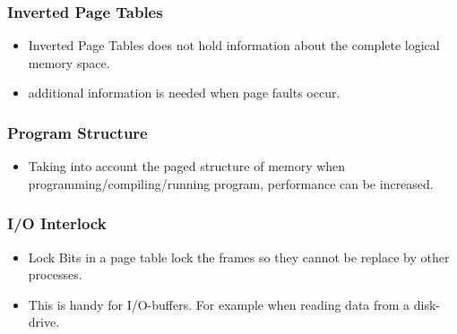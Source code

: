 \documentclass[a4wide,10pt]{article}
\begin{document}
	\subsubsection{Inverted Page Tables} %
	\label{ssub:inverted_page_tables}
	\begin{itemize}
		\item Inverted Page Tables does not hold information about the complete logical memory space.
		\item additional information is needed when page faults occur.
	\end{itemize}
	
	\subsubsection{Program Structure} %
	\label{ssub:program_structure}
	\begin{itemize}
		\item Taking into account the paged structure of memory when programming/compiling/running program, performance can be increased.
	\end{itemize}
	
	\subsubsection{I/O Interlock} %
	\label{ssub:i_o_interlock}
	\begin{itemize}
		\item Lock Bits in a page table lock the frames so they cannot be replace by other processes.
		\item This is handy for I/O-buffers. For example when reading data from a disk-drive.
	\end{itemize}
\end{document}
